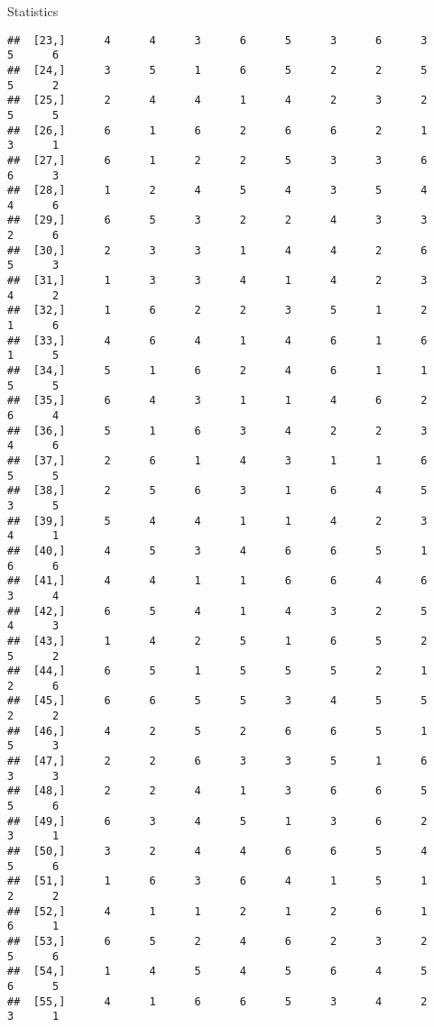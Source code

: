 \documentclass[
  ignorenonframetext,
]{beamer}
\begin{document}
\begin{frame}[fragile]{Statistics}
\begin{verbatim}
##  [23,]      4      4      3      6      5      3      6      3      5      6
##  [24,]      3      5      1      6      5      2      2      5      5      2
##  [25,]      2      4      4      1      4      2      3      2      5      5
##  [26,]      6      1      6      2      6      6      2      1      3      1
##  [27,]      6      1      2      2      5      3      3      6      6      3
##  [28,]      1      2      4      5      4      3      5      4      4      6
##  [29,]      6      5      3      2      2      4      3      3      2      6
##  [30,]      2      3      3      1      4      4      2      6      5      3
##  [31,]      1      3      3      4      1      4      2      3      4      2
##  [32,]      1      6      2      2      3      5      1      2      1      6
##  [33,]      4      6      4      1      4      6      1      6      1      5
##  [34,]      5      1      6      2      4      6      1      1      5      5
##  [35,]      6      4      3      1      1      4      6      2      6      4
##  [36,]      5      1      6      3      4      2      2      3      4      6
##  [37,]      2      6      1      4      3      1      1      6      5      5
##  [38,]      2      5      6      3      1      6      4      5      3      5
##  [39,]      5      4      4      1      1      4      2      3      4      1
##  [40,]      4      5      3      4      6      6      5      1      6      6
##  [41,]      4      4      1      1      6      6      4      6      3      4
##  [42,]      6      5      4      1      4      3      2      5      4      3
##  [43,]      1      4      2      5      1      6      5      2      5      2
##  [44,]      6      5      1      5      5      5      2      1      2      6
##  [45,]      6      6      5      5      3      4      5      5      2      2
##  [46,]      4      2      5      2      6      6      5      1      5      3
##  [47,]      2      2      6      3      3      5      1      6      3      3
##  [48,]      2      2      4      1      3      6      6      5      5      6
##  [49,]      6      3      4      5      1      3      6      2      3      1
##  [50,]      3      2      4      4      6      6      5      4      5      6
##  [51,]      1      6      3      6      4      1      5      1      2      2
##  [52,]      4      1      1      2      1      2      6      1      6      1
##  [53,]      6      5      2      4      6      2      3      2      5      6
##  [54,]      1      4      5      4      5      6      4      5      6      5
##  [55,]      4      1      6      6      5      3      4      2      3      1

\end{verbatim}
\end{frame}
\end{document}
